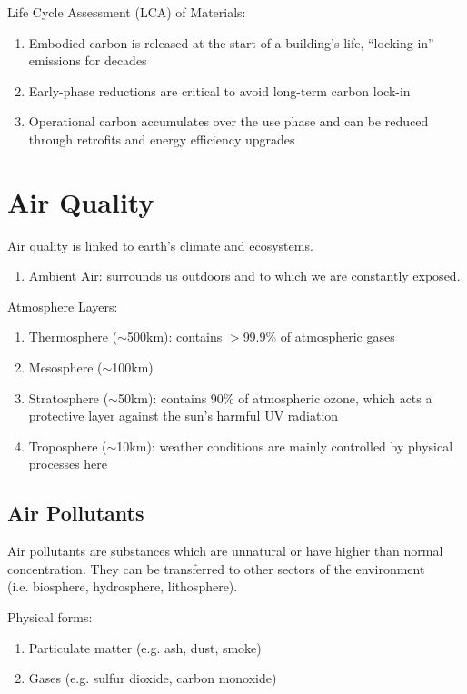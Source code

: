 \documentclass[12pt, a4paper]{article}
\begin{document}
\begin{multicols*}{3}
Life Cycle Assessment (LCA) of Materials:
\begin{enumerate}[\roman*.]
  \item Embodied carbon is released at the start of a building's life, ``locking in'' emissions for decades
  \item Early-phase reductions are critical to avoid long-term carbon lock-in
  \item Operational carbon accumulates over the use phase and can be reduced through retrofits and energy efficiency upgrades
\end{enumerate}

\colbreak
\section{Air Quality}
Air quality is linked to earth’s climate and ecosystems.
\begin{enumerate}[\roman*.]
  \item Ambient Air: surrounds us outdoors and to which we are constantly exposed.
\end{enumerate}

Atmosphere Layers:
\begin{enumerate}[\roman*.]
  \item Thermosphere ($\sim$500km): contains $>$99.9\% of atmospheric gases
  \item Mesosphere ($\sim$100km)
  \item Stratosphere ($\sim$50km): contains 90\% of atmospheric ozone, which acts a protective layer against the sun's harmful UV radiation
  \item Troposphere ($\sim$10km): weather conditions are mainly controlled by physical processes here
\end{enumerate}

\subsection{Air Pollutants}
Air pollutants are substances which are unnatural or have higher than normal concentration. They can be transferred to other sectors of the environment\\(i.e. biosphere, hydrosphere, lithosphere).

Physical forms:
\begin{enumerate}[\roman*.]
  \item Particulate matter (e.g. ash, dust, smoke)
  \item Gases (e.g. sulfur dioxide, carbon monoxide)
\end{enumerate}


\end{multicols*}
\end{document}
